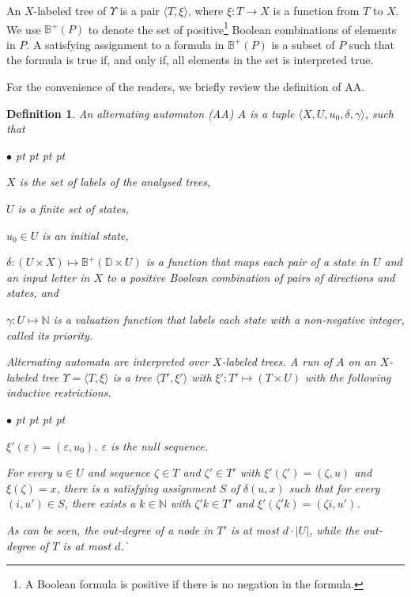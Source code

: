 \documentclass[11pt]{article}
\newtheorem{definition}{Definition}
\newcommand{\bbbbb}{{\mathbb B}}
\newcommand{\bbbbd}{{\mathbb D}}
\newcommand{\nnneg}{{\mathbb N}}
\def\qed{\ifmmode\|\else{\unskip\nobreak\hfil
\penalty50\hskip1em\null\nobreak\hfil$\blacksquare$
\parfillskip=0pt\finalhyphendemerits=0\endgraf}\fi}
\newenvironment{list1}{\begin{list}{$\bullet$}
{\topsep 0 pt \parsep 0 pt \partopsep 0 pt \itemsep 0 pt}}{\end{list}}
\begin{document}
An $X$-labeled tree of $\Upsilon$ is a pair $\langle T,\xi\rangle$, 
where $\xi:T\rightarrow X$ is a function from $T$ to $X$.  
We use $\bbbbb^+(P)$ to denote the 
set of positive\footnote{A Boolean formula is positive if there is 
no negation in the formula.} 
Boolean combinations of elements in $P$.  
A satisfying assignment to a formula in $\bbbbb^+(P)$ is 
a subset of $P$ such that 
the formula is true if, and only if, 
all elements in the set is interpreted true.  

For the convenience of the readers, we briefly review the 
definition of AA.  

\begin{definition}  
An alternating automaton ({\em AA}) 
$A$ is a tuple $\langle X,U,u_0,\delta,\gamma\rangle$, such that
\begin{list1} 
\item $X$ is the set of labels of the analysed trees,
\item $U$ is a finite set of states,
\item $u_0\in U$ is an initial state, 
\item $\delta:(U\times X)\mapsto \bbbbb^+(\bbbbd\times U)$ 
  is a function that maps each pair of a state in $U$ 
  and an input letter in $X$ to 
  a positive Boolean combination of pairs of directions and states, and
\item $\gamma:U\mapsto \nnneg$ is a valuation function that 
  labels each state with a non-negative integer, called its {\em priority}.  
\end{list1} 
Alternating automata are interpreted over $X$-labeled trees.
A \emph{run} of $A$ 
on an $X$-labeled tree $\Upsilon=\langle T,\xi\rangle$ is a tree 
$\langle T',\xi' \rangle$ 
with $\xi':T' \mapsto (T\times U)$ with the following 
inductive restrictions. 
\begin{list1}
\item $\xi'(\varepsilon)=(\varepsilon,u_0)$.  
  $\varepsilon$ is the null sequence. 
\item For every $u\in U$ and sequence $\zeta\in T$ and $\zeta'\in T'$ 
  with $\xi'(\zeta')=(\zeta,u)$ and $\xi(\zeta)=x$, 
  there is a satisfying assignment 
  $S$ of $\delta(u,x)$ such that 
  for every $(i,u')\in S$, there exists a $k\in\nnneg$ with 
  $\zeta'k\in T'$ and $\xi'(\zeta'k)=(\zeta i, u')$.  
\end{list1}
As can be seen, the out-degree of a node in $T'$ is at most $d\cdot|U|$, 
while the out-degree of $T$ is at most $d$.  
\qed 
\end{definition} 
\end{document}
